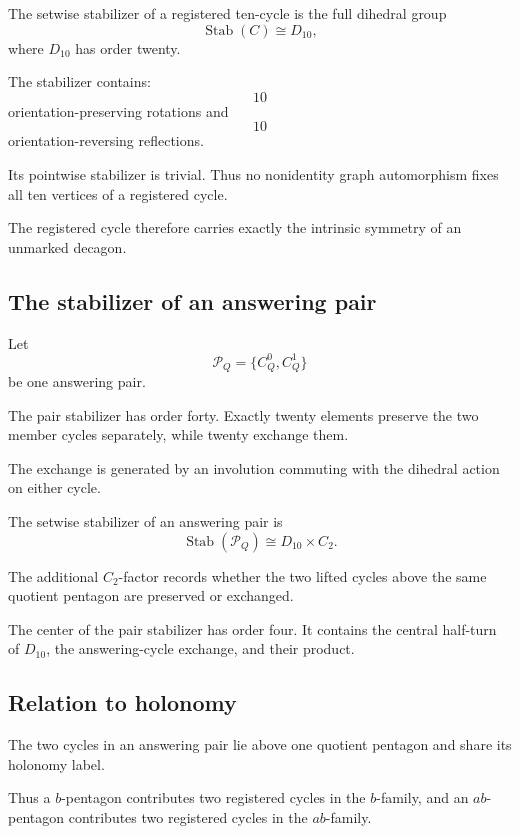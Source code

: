 \begin{theorem}
The setwise stabilizer of a registered ten-cycle is the full dihedral
group
\[
\operatorname{Stab}(C)\cong D_{10},
\]
where \(D_{10}\) has order twenty.
\end{theorem}

The stabilizer contains:
\[
10
\]
orientation-preserving rotations and
\[
10
\]
orientation-reversing reflections.

Its pointwise stabilizer is trivial. Thus no nonidentity graph
automorphism fixes all ten vertices of a registered cycle.

The registered cycle therefore carries exactly the intrinsic symmetry
of an unmarked decagon.

\subsection{The stabilizer of an answering pair}

Let
\[
\mathcal P_Q=\{C_Q^0,C_Q^1\}
\]
be one answering pair.

The pair stabilizer has order forty. Exactly twenty elements preserve
the two member cycles separately, while twenty exchange them.

The exchange is generated by an involution commuting with the
dihedral action on either cycle.

\begin{theorem}
The setwise stabilizer of an answering pair is
\[
\operatorname{Stab}(\mathcal P_Q)
\cong
D_{10}\times C_2.
\]
\end{theorem}

The additional \(C_2\)-factor records whether the two lifted cycles
above the same quotient pentagon are preserved or exchanged.

The center of the pair stabilizer has order four. It contains the
central half-turn of \(D_{10}\), the answering-cycle exchange, and
their product.

\subsection{Relation to holonomy}

The two cycles in an answering pair lie above one quotient pentagon
and share its holonomy label.

Thus a \(b\)-pentagon contributes two registered cycles in the
\(b\)-family, and an \(ab\)-pentagon contributes two registered cycles
in the \(ab\)-family.

